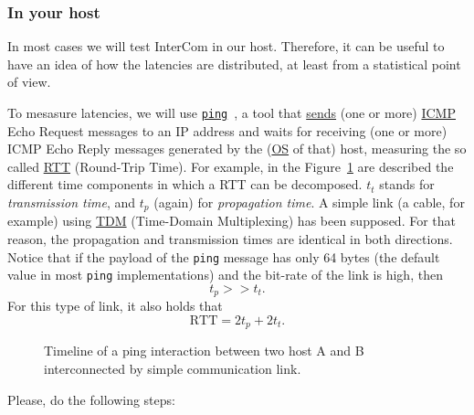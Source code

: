 \subsubsection{In your host}

In most cases we will test InterCom in our host. Therefore, it can be
useful to have an idea of how the latencies are distributed, at least
from a statistical point of view.

To mesasure latencies, we will use
\href{https://github.com/torvalds/linux/blob/master/net/ipv4/ping.c}{\texttt{ping}}~\cite{Kurose-Ross,Forouzan},
a tool that
\href{https://en.wikipedia.org/wiki/Ping_(networking_utility)}{sends}
(one or more)
\href{https://en.wikipedia.org/wiki/Internet_Control_Message_Protocol}{ICMP}
Echo Request messages to an IP address and waits for receiving (one or
more) ICMP Echo Reply messages generated by the
(\href{https://en.wikipedia.org/wiki/Operating_system}{OS} of that)
host, measuring the so called
\href{https://en.wikipedia.org/wiki/Round-trip_delay}{RTT} (Round-Trip
Time). For example, in the Figure~\ref{fig:ping_timeline} are
described the different time components in which a RTT can be
decomposed. $t_t$ stands for \emph{transmission time}, and $t_p$
(again) for \emph{propagation time}. A simple link (a cable, for
example) using
\href{https://en.wikipedia.org/wiki/Time-division_multiple_access}{TDM}
(Time-Domain Multiplexing) has been supposed. For that reason, the
propagation and transmission times are identical in both
directions. Notice that if the payload of the \texttt{ping} message
has only 64 bytes (the default value in most \texttt{ping}
implementations) and the bit-rate of the link is high,
then $$t_p>>t_t.$$ For this type of link, it also holds that
\begin{equation}
  \text{RTT} = 2t_p + 2t_t.
  \label{eq:RTT}
\end{equation}
  
\begin{figure}
  \begin{center}
  \end{center}
  \caption{Timeline of a ping interaction between two host A and B
    interconnected by simple communication link.}
  \label{fig:ping_timeline}
\end{figure}

Please, do the following steps:

